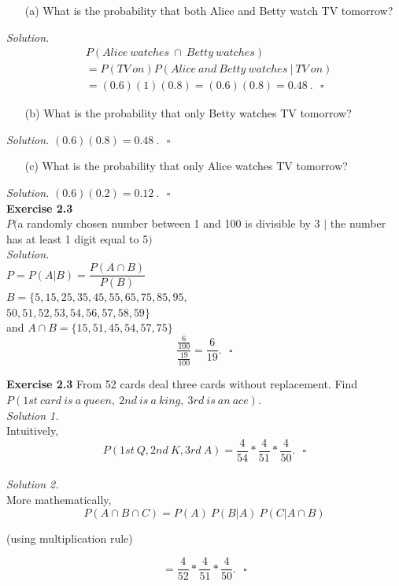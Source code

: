 \documentclass[12pt]{book}
\begin{document}
\begin{itemize} \item [(a)] What is the probability that both Alice and Betty watch TV tomorrow? \end{itemize}
\textit{Solution.}
\begin{align*}
&P(Alice~watches~\cap~Betty~watches)\\
&=P(TV~on)P(Alice~and~Betty~watches~|~TV~on)\\
&=(0.6)(1)(0.8)=(0.6)(0.8)=0.48~.~~~\square
\end{align*}

\begin{itemize} \item [(b)] What is the probability that only Betty watches TV tomorrow? \end{itemize}
\textit{Solution.}
$(0.6)(0.8)=0.48~.~~~\square$

\begin{itemize} \item [(c)] What is the probability that only Alice watches TV tomorrow? \end{itemize}
\textit{Solution.}
$(0.6)(0.2)=0.12~.~~~\square$\\

\noindent \textbf{Exercise 2.3} \\
$P($a randomly chosen number between 1 and 100 is divisible by 3 $|$ the number has at least 1 digit equal to 5$)$\\
\textit{Solution.}\\
$P=P(A|B)=\dfrac{P(A\cap B)}{P(B)}$\\
$B=\{5,15,25,35,45,55,65,75,85,95,$\\
$50,51,52,53,54,56,57,58,59\}$\\

\noindent and $A\cap B = \{15,51,45,54,57,75\}$
$$\dfrac{\frac{6}{100}}{\frac{19}{100}}=\dfrac{6}{19}.~~~\square$$

\newpage
\noindent \textbf{Exercise 2.3} From 52 cards deal three cards without replacement. Find $P(1st~card~is~a~queen,~2nd~is~a~king,~3rd~is~an~ace)$.\\

\noindent \textit{Solution 1.} \\
Intuitively, 
$$P(1st~Q,2nd~K,3rd~A)=\dfrac{4}{54} * \dfrac{4}{51} * \dfrac{4}{50}.~~~\square$$\\

\noindent \textit{Solution 2.} \\
More mathematically,\\
$$P(A\cap B \cap C) = P(A)~P(B|A)~P(C|A\cap B)$$ \begin{center}(using multiplication rule)\end{center}
$$=\dfrac{4}{52} * \dfrac{4}{51} * \dfrac{4}{50}.~~~\square$$
\end{document}
